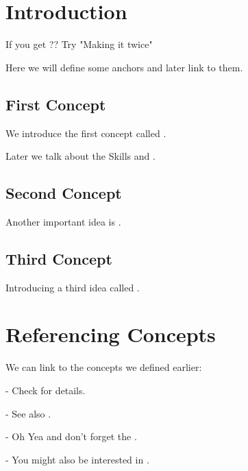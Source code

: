 \documentclass[12pt]{article}
\begin{document}
\section{Introduction}

If you get ?? Try "Making it twice"

Here we will define some anchors and later link to them.

\subsection{First Concept}

We introduce the first concept called \textbf{}.

\lipsum[1]

Later we talk about the Skills  and .

\newpage

\subsection{Second Concept}

Another important idea is \textbf{}.

\lipsum[2]
\newpage

\subsection{Third Concept}

Introducing a third idea called \textbf{}.

\lipsum[3]
\newpage

\section{Referencing Concepts}

We can link to the concepts we defined earlier:

- Check  for details.

- See also .

- Oh Yea and don't forget the .

- You might also be interested in .

\lipsum[3]
\newpage

\printindex
\end{document}
